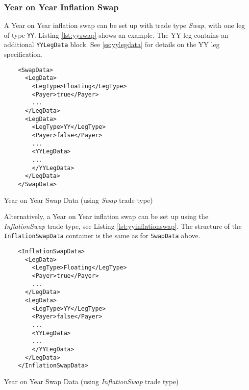 \subsubsection{Year on Year Inflation Swap}

A Year on Year inflation swap can be set up with trade type \emph{Swap}, with one leg of type {\tt YY}. Listing \ref{lst:yyswap} shows an
example. The YY leg contains an additional {\tt YYLegData} block. See \ref{ss:yylegdata} for details on the YY leg
specification.

\begin{listing}[H]
\begin{verbatim}
    <SwapData>
      <LegData>
        <LegType>Floating</LegType>
        <Payer>true</Payer>
        ...
      </LegData>
      <LegData>
        <LegType>YY</LegType>
        <Payer>false</Payer>
        ...
        <YYLegData>
        ...
        </YYLegData>
      </LegData>
    </SwapData>
\end{verbatim}
\caption{Year on Year Swap Data (using \emph{Swap} trade type)}
\label{lst:yyswap}
\end{listing}

Alternatively, a Year on Year inflation swap can be set up using the \emph{InflationSwap} trade type, see Listing \ref{lst:yyinflationswap}. The structure of the {\tt InflationSwapData} container is the same as for {\tt SwapData} above.

\begin{listing}[H]
\begin{verbatim}
    <InflationSwapData>
      <LegData>
        <LegType>Floating</LegType>
        <Payer>true</Payer>
        ...
      </LegData>
      <LegData>
        <LegType>YY</LegType>
        <Payer>false</Payer>
        ...
        <YYLegData>
        ...
        </YYLegData>
      </LegData>
    </InflationSwapData>
\end{verbatim}
\caption{Year on Year Swap Data (using \emph{InflationSwap} trade type)}
\label{lst:yyinflationswap}
\end{listing}